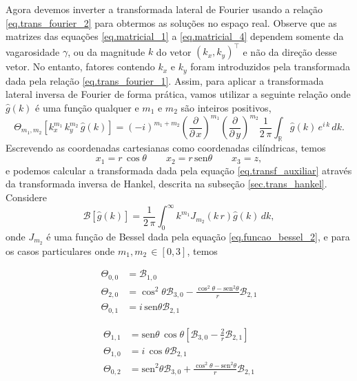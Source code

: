 Agora devemos inverter a transformada lateral de Fourier usando a rela\c{c}\~ao \ref{eq.trans_fourier_2} para obtermos as solu\c{c}\~oes no espa\c{c}o real. Observe que as matrizes das equa\c{c}\~oes \ref{eq.matricial_1} a \ref{eq.matricial_4} dependem somente da vagarosidade $\gamma$, ou da magnitude $k$ do vetor $(k_x,k_y)^\top$ e n\~ao da dire\c{c}\~ao desse vetor. No entanto, fatores contendo $k_x$ e $k_y$ foram introduzidos pela transformada dada pela rela\c{c}\~ao \ref{eq.trans_fourier_1}. Assim, para aplicar a transformada lateral inversa de Fourier de forma pr\'atica, vamos utilizar a seguinte rela\c{c}\~ao onde $\hat{g}(k)$ \'e uma fun\c{c}\~ao qualquer e $m_1$ e $m_2$ s\~ao inteiros positivos, 
\begin{equation}\label{eq.transf_auxiliar}
\Theta_{m_1,m_2}[k_x^{m_1}\,k_y^{m_2}\,\hat{g}(k)]=(-i)^{m_1+m_2}\left(\frac{\partial}{\partial\,x}\right)^{m_1}\left(\frac{\partial}{\partial\,y}\right)^{m_2}\frac{1}{2\,\pi}\int_{\mathbb{R}}\hat{g}(k)\,e^{i\,k}\,dk.
\end{equation}
Escrevendo as coordenadas cartesianas como coordenadas cil\'indricas, temos
\begin{equation}
x_1=r\,\cos\theta\qquad x_2=r\,\text{sen}\theta\qquad x_3=z,
\end{equation}
e podemos calcular a transformada dada pela equa\c{c}\~ao \ref{eq.transf_auxiliar} atrav\'es da transformada inversa de Hankel, descrita na subse\c{c}\~ao \ref{sec.trans_hankel}. Considere
\begin{equation}\label{eq.trans_hankel_adapt}
\mathcal{B}[\hat{g}(k)]=\frac{1}{2\,\pi}\int_0^\infty k^{m_1}J_{m_2}(k\,r)\hat{g}(k)\,dk,
\end{equation}
onde $J_{m_2}$ \'e uma fun\c{c}\~ao de Bessel dada pela equa\c{c}\~ao \ref{eq.funcao_bessel_2}, e para os casos particulares onde $m_1,m_2\,\in[0,3]$, temos\\
\begin{minipage}{.5\textwidth}
\begin{align*}
\Theta_{0,0}&=\mathcal{B}_{1,0}\\
\Theta_{2,0}&=\cos^2\theta\mathcal{B}_{3,0}-\frac{\cos^2\theta-\text{sen}^2\theta}{r}\mathcal{B}_{2,1}\\
\Theta_{0,1}&=i\,\text{sen}\theta\mathcal{B}_{2,1}
\end{align*}
\end{minipage}
\begin{minipage}{.5\textwidth}
\begin{align*}
\Theta_{1,1}&=\text{sen}\theta\,\cos\theta\left[\mathcal{B}_{3,0}-\frac{2}{r}\mathcal{B}_{2,1}\right]\\
\Theta_{1,0}&=i\,\cos\theta\mathcal{B}_{2,1}\\
\Theta_{0,2}&=\text{sen}^2\theta\mathcal{B}_{3,0}+\frac{\cos^2\theta-\text{sen}^2\theta}{r}\mathcal{B}_{2,1}
\end{align*}
\end{minipage}





